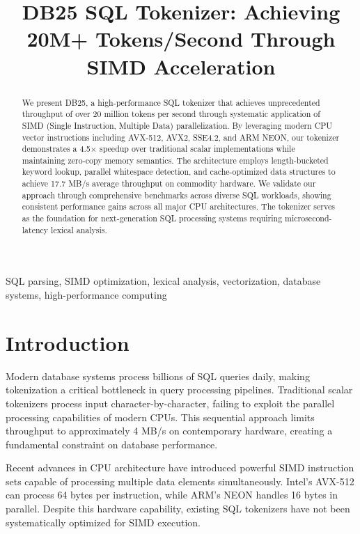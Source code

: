 \documentclass[conference]{IEEEtran}
\title{DB25 SQL Tokenizer: Achieving 20M+ Tokens/Second Through SIMD Acceleration}
\author{\IEEEauthorblockN{Chiradip Mandal}
\IEEEauthorblockA{\textit{Space-RF.org} \\
chiradip@chiradip.com\\
March 2025}}
\begin{document}
\maketitle

\begin{abstract}
We present DB25, a high-performance SQL tokenizer that achieves unprecedented throughput of over 20 million tokens per second through systematic application of SIMD (Single Instruction, Multiple Data) parallelization. By leveraging modern CPU vector instructions including AVX-512, AVX2, SSE4.2, and ARM NEON, our tokenizer demonstrates a 4.5$\times$ speedup over traditional scalar implementations while maintaining zero-copy memory semantics. The architecture employs length-bucketed keyword lookup, parallel whitespace detection, and cache-optimized data structures to achieve 17.7 MB/s average throughput on commodity hardware. We validate our approach through comprehensive benchmarks across diverse SQL workloads, showing consistent performance gains across all major CPU architectures. The tokenizer serves as the foundation for next-generation SQL processing systems requiring microsecond-latency lexical analysis.
\end{abstract}

\begin{IEEEkeywords}
SQL parsing, SIMD optimization, lexical analysis, vectorization, database systems, high-performance computing
\end{IEEEkeywords}

\section{Introduction}

Modern database systems process billions of SQL queries daily, making tokenization a critical bottleneck in query processing pipelines. Traditional scalar tokenizers process input character-by-character, failing to exploit the parallel processing capabilities of modern CPUs. This sequential approach limits throughput to approximately 4 MB/s on contemporary hardware, creating a fundamental constraint on database performance.

Recent advances in CPU architecture have introduced powerful SIMD instruction sets capable of processing multiple data elements simultaneously. Intel's AVX-512 can process 64 bytes per instruction, while ARM's NEON handles 16 bytes in parallel. Despite this hardware capability, existing SQL tokenizers have not been systematically optimized for SIMD execution.
\end{document}
